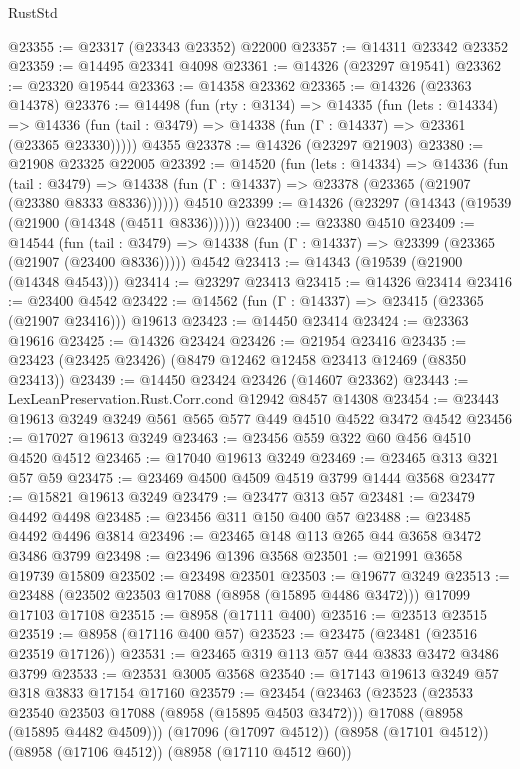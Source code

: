 \begin{lexlean}{RustStd}
\begin{coremodule}
@23355 := @23317 (@23343 @23352) @22000
@23357 := @14311 @23342 @23352
@23359 := @14495 @23341 @4098
@23361 := @14326 (@23297 @19541)
@23362 := @23320 @19544
@23363 := @14358 @23362
@23365 := @14326 (@23363 @14378)
@23376 := @14498
    (fun (rty : @3134) =>
    @14335
      (fun (lets : @14334) =>
      @14336 (fun (tail : @3479) => @14338 (fun (Γ : @14337) => @23361 (@23365 @23330)))))
    @4355
@23378 := @14326 (@23297 @21903)
@23380 := @21908 @23325 @22005
@23392 := @14520
    (fun (lets : @14334) =>
    @14336
      (fun (tail : @3479) =>
      @14338 (fun (Γ : @14337) => @23378 (@23365 (@21907 (@23380 @8333 @8336))))))
    @4510
@23399 := @14326 (@23297 (@14343 (@19539 (@21900 (@14348 (@4511 @8336))))))
@23400 := @23380 @4510
@23409 := @14544
    (fun (tail : @3479) => @14338 (fun (Γ : @14337) => @23399 (@23365 (@21907 (@23400 @8336)))))
    @4542
@23413 := @14343 (@19539 (@21900 (@14348 @4543)))
@23414 := @23297 @23413
@23415 := @14326 @23414
@23416 := @23400 @4542
@23422 := @14562 (fun (Γ : @14337) => @23415 (@23365 (@21907 @23416))) @19613
@23423 := @14450 @23414
@23424 := @23363 @19616
@23425 := @14326 @23424
@23426 := @21954 @23416
@23435 := @23423 (@23425 @23426) (@8479 @12462 @12458 @23413 @12469 (@8350 @23413))
@23439 := @14450 @23424 @23426 (@14607 @23362)
@23443 := LexLeanPreservation.Rust.Corr.cond @12942 @8457 @14308
@23454 := @23443 @19613 @3249 @3249 @561 @565 @577 @449 @4510 @4522 @3472 @4542
@23456 := @17027 @19613 @3249
@23463 := @23456 @559 @322 @60 @456 @4510 @4520 @4512
@23465 := @17040 @19613 @3249
@23469 := @23465 @313 @321 @57 @59
@23475 := @23469 @4500 @4509 @4519 @3799 @1444 @3568
@23477 := @15821 @19613 @3249
@23479 := @23477 @313 @57
@23481 := @23479 @4492 @4498
@23485 := @23456 @311 @150 @400 @57
@23488 := @23485 @4492 @4496 @3814
@23496 := @23465 @148 @113 @265 @44 @3658 @3472 @3486 @3799
@23498 := @23496 @1396 @3568
@23501 := @21991 @3658 @19739 @15809
@23502 := @23498 @23501
@23503 := @19677 @3249
@23513 := @23488 (@23502 @23503 @17088 (@8958 (@15895 @4486 @3472))) @17099 @17103 @17108
@23515 := @8958 (@17111 @400)
@23516 := @23513 @23515
@23519 := @8958 (@17116 @400 @57)
@23523 := @23475 (@23481 (@23516 @23519 @17126))
@23531 := @23465 @319 @113 @57 @44 @3833 @3472 @3486 @3799
@23533 := @23531 @3005 @3568
@23540 := @17143 @19613 @3249 @57 @318 @3833 @17154 @17160
@23579 := @23454
    (@23463
      (@23523
        (@23533 @23540 @23503 @17088 (@8958 (@15895 @4503 @3472)))
        @17088
        (@8958 (@15895 @4482 @4509)))
      (@17096 (@17097 @4512))
      (@8958 (@17101 @4512))
      (@8958 (@17106 @4512))
      (@8958 (@17110 @4512 @60))

\end{coremodule}
\end{lexlean}
